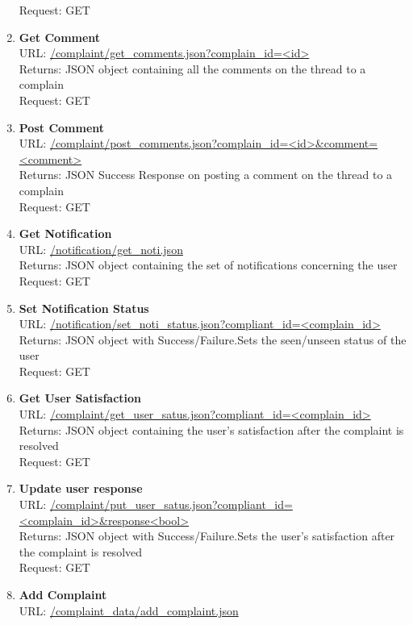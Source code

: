 \documentclass{article}
\begin{document}
\begin{enumerate}
						Request: GET 
					\item \textbf{Get Comment} \\
						URL: \url{/complaint/get_comments.json?complain_id=<id>}\\
						Returns:  JSON object containing all the comments on the thread to a complain\\
						Request: GET
					\item \textbf{Post Comment} \\
						URL: \url{/complaint/post_comments.json?complain_id=<id>&comment=<comment>}\\
						Returns: JSON Success Response on posting a comment on the thread to a complain\\
						Request: GET
					\item \textbf{Get Notification} \\
						URL: \url{/notification/get_noti.json}\\
						Returns: JSON object containing the set of notifications concerning the user\\
						Request: GET
					\item \textbf{Set Notification Status} \\
						URL: \url{/notification/set_noti_status.json?compliant_id=<complain_id>}\\
						Returns: JSON object with Success/Failure.Sets the seen/unseen status of the user\\
						Request: GET
					\item \textbf{Get User Satisfaction} \\
						URL: \url{/complaint/get_user_satus.json?compliant_id=<complain_id>}\\
						Returns: JSON object containing the user's satisfaction after the complaint is resolved\\
						Request: GET
					\item \textbf{Update user response} \\
						URL: \url{/complaint/put_user_satus.json?compliant_id=<complain_id>&response<bool>}\\
						Returns: JSON object with Success/Failure.Sets the user's satisfaction after the complaint is resolved\\
						Request: GET
					\item \textbf{Add Complaint} \\
						URL: \url{/complaint_data/add_complaint.json}\\

\end{enumerate}
\end{document}
